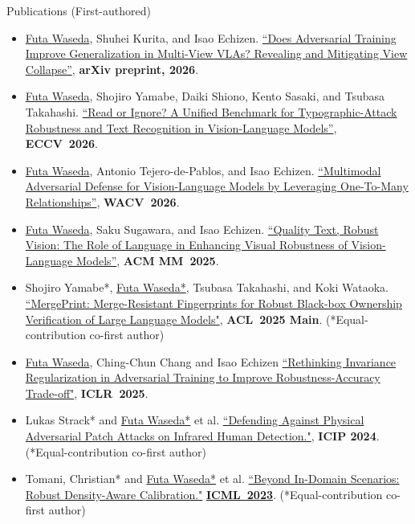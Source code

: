 \documentclass[]{mcdowellcv}
\begin{document}
\begin{cvsection}{Publications (First-authored)}
    \begin{cvsubsection}{}{}{}
      \begin{itemize}
            \item \ul{Futa Waseda}, Shuhei Kurita, and Isao Echizen.
            \href{https://arxiv.org/abs/2609.33707}{``Does Adversarial Training Improve Generalization in Multi-View VLAs? Revealing and Mitigating View Collapse''}, \textbf{arXiv preprint, 2026}.
            \item \ul{Futa Waseda}, Shojiro Yamabe, Daiki Shiono, Kento Sasaki, and Tsubasa Takahashi.
            \href{https://arxiv.org/abs/2512.11899}{``Read or Ignore? A Unified Benchmark for Typographic-Attack Robustness and Text Recognition in Vision-Language Models''}, \textbf{ECCV~2026}.
            \item \ul{Futa Waseda}, Antonio Tejero-de-Pablos, and Isao Echizen.
            \href{https://arxiv.org/abs/2405.18770}{``Multimodal Adversarial Defense for Vision-Language Models by Leveraging One-To-Many Relationships''}, \textbf{WACV~2026}.
            \item \ul{Futa Waseda}, Saku Sugawara, and Isao Echizen. \href{https://arxiv.org/abs/2507.16257}{``Quality Text, Robust Vision: The Role of Language in Enhancing Visual Robustness of Vision-Language Models''}, \textbf{ACM MM~2025}.
            \item Shojiro Yamabe*, \ul{Futa Waseda*}, Tsubasa Takahashi, and Koki Wataoka. \href{https://arxiv.org/abs/2410.08604v4}{``MergePrint: Merge-Resistant Fingerprints for Robust Black-box Ownership Verification of Large Language Models"}, \textbf{ACL~2025 Main}. (*Equal-contribution co-first author)
            \item \ul{Futa Waseda}, Ching-Chun Chang and Isao Echizen \href{https://arxiv.org/abs/2402.14648}{``Rethinking Invariance Regularization in Adversarial Training to Improve Robustness-Accuracy Trade-off"}, \textbf{ICLR~2025}.
            \item Lukas Strack* and \ul{Futa Waseda*} et al. \href{https://arxiv.org/abs/2309.15519}{``Defending Against Physical Adversarial Patch Attacks on Infrared Human Detection."}, \textbf{ICIP 2024}. (*Equal-contribution co-first author)
            \item Tomani, Christian* and \ul{Futa Waseda*} et al. \href{https://arxiv.org/abs/2302.05118}{``Beyond In-Domain Scenarios: Robust Density-Aware Calibration."} \textbf{\href{https://icml.cc/Conferences/2023}{ICML~2023}}. (*Equal-contribution co-first author)

\end{itemize}
\end{cvsubsection}
\end{cvsection}
\end{document}
